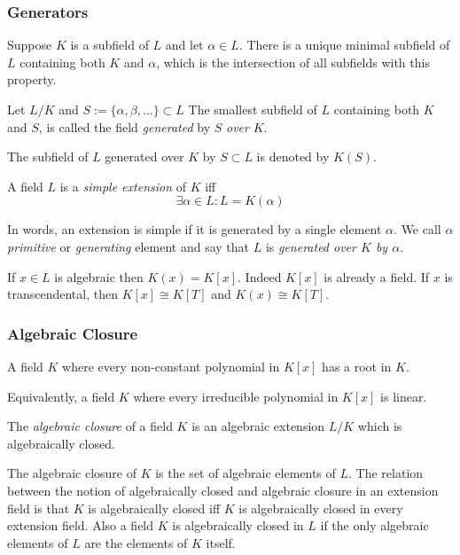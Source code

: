 \subsubsection{Generators}
Suppose \(K\) is a subfield of \(L\) and let \(\alpha \in L\).
There is a unique minimal subfield of \(L\) containing both \(K\) and \(\alpha\), which is the intersection of all subfields with this property.

\begin{definition}
   Let \(L/K\) and \(S := \{\alpha, \beta, \ldots\} \subset L\)
   The smallest subfield of \(L\) containing both \(K\) and \(S\), is called the field \emph{generated} by \(S\) \emph{over} \(K\).
\end{definition}
\begin{remark}[Notation]
   The subfield of \(L\) generated over \(K\) by \(S \subset L\) is denoted by \(K(S)\).
\end{remark}

\begin{definition}
   A field \(L\) is a \emph{simple extension} of \(K\) iff
   \[\exists \alpha \in L: L = K(\alpha)\]
\end{definition}
\begin{remark}[Terminology]
   In words, an extension is simple if it is generated by a single element \(\alpha\).
   We call \(\alpha\) \emph{primitive} or \emph{generating} element and say that \(L\) is \emph{generated over \(K\) by \(\alpha\)}.
\end{remark}

   If \(x \in L\) is algebraic then \(K(x) = K[x]\).
   Indeed \(K[x]\) is already a field.
   If \(x\) is transcendental, then \(K[x] \cong K[T]\) and \(K(x) \cong K[T]\).

\subsubsection{Algebraic Closure}
\begin{definition}
   A field \(K\) where every non-constant polynomial in \(K[x]\) has a root in \(K\).
\end{definition}
\begin{remark}
   Equivalently, a field \(K\) where every irreducible polynomial in \(K[x]\) is linear.
\end{remark}

\begin{definition}
   The \emph{algebraic closure} of a field \(K\) is an algebraic extension \(L/K\) which is algebraically closed.
\end{definition}
\begin{remark}[Intuition]
   The algebraic closure of \(K\) is the set of algebraic elements of \(L\).
   The relation between the notion of algebraically closed and algebraic closure in an extension field is that \(K\) is algebraically closed iff \(K\) is algebraically closed in every extension field.
   Also a field \(K\) is algebraically closed in \(L\) if the only algebraic elements of \(L\) are the elements of \(K\) itself.
\end{remark}

